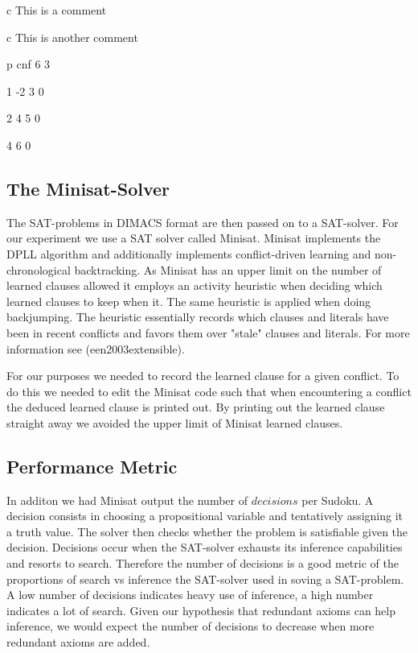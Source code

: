 \documentclass{article}
\begin{document}
c This is a comment

c This is another comment

p cnf 6 3

1 -2 3 0

2 4 5 0

4 6 0



\subsection{The Minisat-Solver}
The SAT-problems in DIMACS format are then passed on to a SAT-solver. For our experiment we use a SAT solver called Minisat. Minisat implements the DPLL algorithm and additionally implements conflict-driven learning and non-chronological backtracking. As Minisat has an upper limit on the number of learned clauses allowed it employs an activity heuristic when deciding which learned clauses to keep when it. The same heuristic is applied when doing backjumping. The heuristic essentially records which clauses and literals have been in recent conflicts and favors them over "stale" clauses and literals. For more information see (een2003extensible).

For our purposes we needed to record the learned clause for a given conflict. To do this we needed to edit the Minisat code such that when encountering a conflict the deduced learned clause is printed out. By printing out the learned clause straight away we avoided the upper limit of Minisat learned clauses.

\subsection{Performance Metric}

In additon we had Minisat output the number of $decisions$ per Sudoku. A decision consists in choosing a propositional variable and tentatively assigning it a truth value. The solver then checks whether the problem is satisfiable given the decision. Decisions occur when the SAT-solver exhausts its inference capabilities and resorts to search. Therefore the number of decisions is a good metric of the proportions of search vs inference the SAT-solver used in soving a SAT-problem. A low number of decisions indicates heavy use of inference, a high number indicates a lot of search.
Given our hypothesis that redundant axioms can help inference, we would expect the number of decisions to decrease when more redundant axioms are added.
\end{document}
